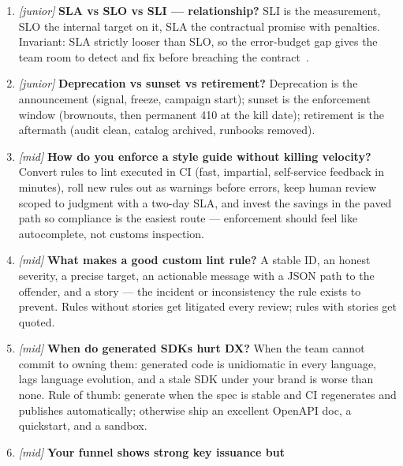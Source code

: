 \begin{enumerate}[label=\textbf{Q\arabic*.}, leftmargin=1.7cm]
        successful (2xx) call. Reduce it by attacking the funnel step
        with the worst conversion: self-service instant keys
        (signup$\rightarrow$key), a 15-minute quickstart and sandbox
        (key$\rightarrow$call), and actionable error messages
        (call$\rightarrow$200). Instrument first; never optimize the
        funnel blind.
  \item \emph{[junior]} \textbf{SLA vs SLO vs SLI --- relationship?}
        SLI is the measurement, SLO the internal target on it, SLA the
        contractual promise with penalties. Invariant: SLA strictly
        looser than SLO, so the error-budget gap gives the team room to
        detect and fix before breaching the contract~\cite{beyer2016sre}.
  \item \emph{[junior]} \textbf{Deprecation vs sunset vs retirement?}
        Deprecation is the announcement (signal, freeze, campaign start);
        sunset is the enforcement window (brownouts, then permanent 410
        at the kill date); retirement is the aftermath (audit clean,
        catalog archived, runbooks removed).
  \item \emph{[mid]} \textbf{How do you enforce a style guide without
        killing velocity?} Convert rules to lint executed in CI
        (fast, impartial, self-service feedback in minutes), roll new
        rules out as warnings before errors, keep human review scoped to
        judgment with a two-day SLA, and invest the savings in the paved
        path so compliance is the easiest route --- enforcement should
        feel like autocomplete, not customs inspection.
  \item \emph{[mid]} \textbf{What makes a good custom lint rule?} A
        stable ID, an honest severity, a precise target, an actionable
        message with a JSON path to the offender, and a story --- the
        incident or inconsistency the rule exists to prevent. Rules
        without stories get litigated every review; rules with stories
        get quoted.
  \item \emph{[mid]} \textbf{When do generated SDKs hurt DX?} When the
        team cannot commit to owning them: generated code is unidiomatic
        in every language, lags language evolution, and a stale SDK
        under your brand is worse than none. Rule of thumb: generate when
        the spec is stable and CI regenerates and publishes
        automatically; otherwise ship an excellent OpenAPI doc, a
        quickstart, and a sandbox.
  \item \emph{[mid]} \textbf{Your funnel shows strong key issuance but
}
\end{enumerate}
